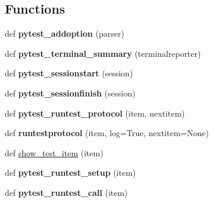 \subsection*{Functions}
\begin{DoxyCompactItemize}
\item 
\mbox{\label{namespace__pytest_1_1runner_a99bf92679fc75f89e50ed89c5b2b75f1}} 
def {\bfseries pytest\+\_\+addoption} (parser)
\item 
\mbox{\label{namespace__pytest_1_1runner_acc5ae35b04c91ab7e83ae1fe51a6b13a}} 
def {\bfseries pytest\+\_\+terminal\+\_\+summary} (terminalreporter)
\item 
\mbox{\label{namespace__pytest_1_1runner_a11c71f780895938e54a5aed050cdff92}} 
def {\bfseries pytest\+\_\+sessionstart} (session)
\item 
\mbox{\label{namespace__pytest_1_1runner_a2a4f05432c91395553257a78513e3968}} 
def {\bfseries pytest\+\_\+sessionfinish} (session)
\item 
\mbox{\label{namespace__pytest_1_1runner_ac1abbcc399e9fe3bdb417c6a05964562}} 
def {\bfseries pytest\+\_\+runtest\+\_\+protocol} (item, nextitem)
\item 
\mbox{\label{namespace__pytest_1_1runner_ada84e21ee58786db41d00e574b50b960}} 
def {\bfseries runtestprotocol} (item, log=True, nextitem=None)
\item 
def \hyperlink{namespace__pytest_1_1runner_aa36efa3427e0fd47ace399d7d47794fd}{show\+\_\+test\+\_\+item} (item)
\item 
\mbox{\label{namespace__pytest_1_1runner_af6ef556cf06ac8675e896b20c80edae9}} 
def {\bfseries pytest\+\_\+runtest\+\_\+setup} (item)
\item 
\mbox{\label{namespace__pytest_1_1runner_a2279e083fcd969979fb1f9b68f5528a5}} 
def {\bfseries pytest\+\_\+runtest\+\_\+call} (item)
\item 
\mbox{\label{namespace__pytest_1_1runner_a2c9e5744bc4ed12cd962482082885c91}} 

\end{DoxyCompactItemize}
